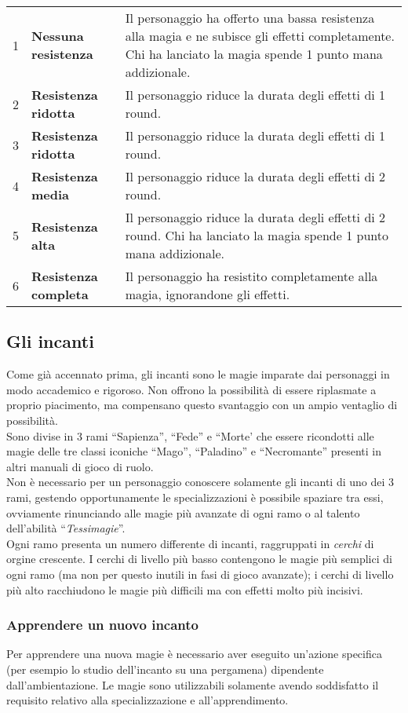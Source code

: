 \documentclass[../manuale_main.tex]{subfiles}
\begin{document}
\begin{tabularx}{\linewidth}{c l X}
1&\textbf{Nessuna resistenza}&Il personaggio ha offerto una bassa resistenza alla magia e ne subisce gli effetti completamente. Chi ha lanciato la magia spende 1 punto mana addizionale.\\
2&\textbf{Resistenza ridotta}&Il personaggio riduce la durata degli effetti di 1 round.\\
3&\textbf{Resistenza ridotta}&Il personaggio riduce la durata degli effetti di 1 round.\\
4&\textbf{Resistenza media}&Il personaggio riduce la durata degli effetti di 2 round.\\
5&\textbf{Resistenza alta}&Il personaggio riduce la durata degli effetti di 2 round. Chi ha lanciato la magia spende 1 punto mana addizionale.\\
6&\textbf{Resistenza completa}&Il personaggio ha resistito completamente alla magia, ignorandone gli effetti.\\
\end{tabularx}

\subsection{Gli incanti}
Come già accennato prima, gli incanti sono le magie imparate dai personaggi in modo accademico e rigoroso. Non offrono la possibilità di essere riplasmate a proprio piacimento, ma compensano questo svantaggio con un ampio ventaglio di possibilità.\\
Sono divise in 3 rami ``Sapienza'', ``Fede'' e ``Morte' che essere ricondotti alle magie delle tre classi iconiche ``Mago'', ``Paladino'' e ``Necromante'' presenti in altri manuali di gioco di ruolo.\\
Non è necessario per un personaggio conoscere solamente gli incanti di uno dei 3 rami, gestendo opportunamente le specializzazioni è possibile spaziare tra essi, ovviamente rinunciando alle magie più avanzate di ogni ramo o al talento dell'abilità ``\emph{Tessimagie}''.\\
Ogni ramo presenta un numero differente di incanti, raggruppati in \emph{cerchi} di orgine crescente. I cerchi di livello più basso contengono le magie più semplici di ogni ramo (ma non per questo inutili in fasi di gioco avanzate); i cerchi di livello più alto racchiudono le magie più difficili ma con effetti molto più incisivi.



\subsubsection{Apprendere un nuovo incanto}
Per apprendere una nuova magie è necessario aver eseguito un'azione specifica (per esempio lo studio dell'incanto su una pergamena) dipendente dall'ambientazione.
Le magie sono utilizzabili solamente avendo soddisfatto il requisito relativo alla specializzazione e all'apprendimento.
\end{document}
